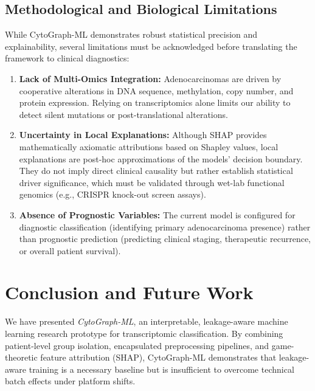 \documentclass[journal,10pt]{IEEEtran}
\begin{document}
\subsection{Methodological and Biological Limitations}
While CytoGraph-ML demonstrates robust statistical precision and explainability, several limitations must be acknowledged before translating the framework to clinical diagnostics:
\begin{enumerate}
    \item \textbf{Lack of Multi-Omics Integration:} Adenocarcinomas are driven by cooperative alterations in DNA sequence, methylation, copy number, and protein expression. Relying on transcriptomics alone limits our ability to detect silent mutations or post-translational alterations.
    \item \textbf{Uncertainty in Local Explanations:} Although SHAP provides mathematically axiomatic attributions based on Shapley values, local explanations are post-hoc approximations of the models' decision boundary. They do not imply direct clinical causality but rather establish statistical driver significance, which must be validated through wet-lab functional genomics (e.g., CRISPR knock-out screen assays).
    \item \textbf{Absence of Prognostic Variables:} The current model is configured for diagnostic classification (identifying primary adenocarcinoma presence) rather than prognostic prediction (predicting clinical staging, therapeutic recurrence, or overall patient survival).
\end{enumerate}

\section{Conclusion and Future Work}
We have presented \textit{CytoGraph-ML}, an interpretable, leakage-aware machine learning research prototype for transcriptomic classification. By combining patient-level group isolation, encapsulated preprocessing pipelines, and game-theoretic feature attribution (SHAP), CytoGraph-ML demonstrates that leakage-aware training is a necessary baseline but is insufficient to overcome technical batch effects under platform shifts.
\end{document}
